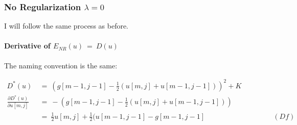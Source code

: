 \documentclass{report}
\begin{document}
			\subsubsection{No Regularization $\lambda = 0$}
			\startsubsection
				I will follow the same process as before.
				\vspace{-0.4cm} \paragraph{Derivative of  $E_{NR}(u) \ = \ D(u)$}
				\startsubsection
					The naming convention is the same:
				\closesection
				\begin{adjustwidth}{-7em}{}
					\vspace{-0.6cm}
					\begin{align*}
						D^*(u) \ & = \ (g[m-1,j-1] - \frac{1}{2} (u[m,j] + u[m-1,j-1]))^2 + K \\
						\frac{\partial D^*(u)}{\partial u[m,j]} \ & = \ - (g[m-1,j-1] - \frac{1}{2} (u[m,j] + u[m-1,j-1])) \\
						& = \ \frac{1}{2} u[m,j]  + \frac{1}{2} (u[m-1,j-1] - g[m-1,j-1] \hspace{4cm} (Df)
					\end{align*}
				\end{adjustwidth}
			\closesection
\end{document}
